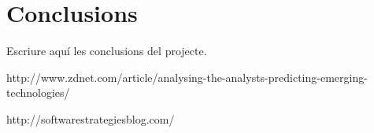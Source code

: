 \cleardoublepage
{}
\chapter*{Conclusions}

Escriure aquí les conclusions del projecte. 

http://www.zdnet.com/article/analysing-the-analysts-predicting-emerging-technologies/

http://softwarestrategiesblog.com/
